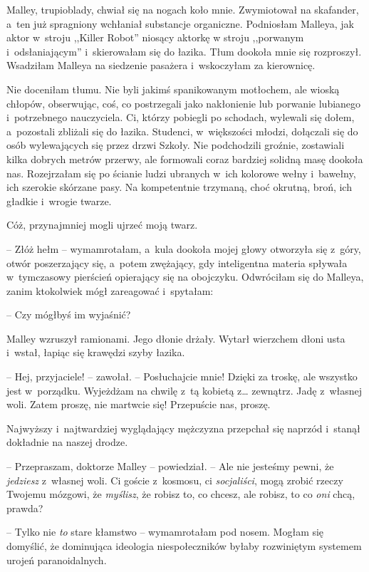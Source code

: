 \documentclass[oneside,polish,11pt,sfheadings]{mwbk}
\begin{document}
Malley, trupioblady, chwiał się na nogach koło mnie. Zwymiotował na
skafander, a~ten już spragniony wchłaniał substancje organiczne.
Podniosłam Malleya, jak aktor w~stroju ,,Killer Robot'' niosący aktorkę
w stroju ,,porwanym i~odsłaniającym'' i~skierowałam się do łazika. Tłum
dookoła mnie się rozproszył. Wsadziłam Malleya na siedzenie pasażera i~wskoczyłam za kierownicę.

Nie doceniłam tłumu. Nie byli jakimś spanikowanym motłochem, ale wioską
chłopów, obserwując, coś, co postrzegali jako nakłonienie lub porwanie
lubianego i~potrzebnego nauczyciela. Ci, którzy pobiegli po schodach,
wylewali się dołem, a~pozostali zbliżali się do łazika. Studenci, w~większości młodzi, dołączali się do osób wylewających się przez drzwi
Szkoły. Nie podchodzili groźnie, zostawiali kilka dobrych metrów
przerwy, ale formowali coraz bardziej solidną masę dookoła nas.
Rozejrzałam się po ścianie ludzi ubranych w~ich kolorowe wełny i~bawełny, ich szerokie skórzane pasy. Na kompetentnie trzymaną, choć
okrutną, broń, ich gładkie i~wrogie twarze.

Cóż, przynajmniej mogli ujrzeć moją twarz. 

-- Złóż hełm -- wymamrotałam, a~kula dookoła mojej głowy otworzyła się z~góry, otwór poszerzający się, a~potem zwężający, gdy inteligentna materia spływała w~tymczasowy
pierścień opierający się na obojczyku. Odwróciłam się do Malleya, zanim
ktokolwiek mógł zareagować i~spytałam:

-- Czy mógłbyś im wyjaśnić?

Malley wzruszył ramionami. Jego dłonie drżały. Wytarł wierzchem dłoni
usta i~wstał, łapiąc się krawędzi szyby łazika.

-- Hej, przyjaciele! -- zawołał. -- Posłuchajcie mnie! Dzięki za troskę,
ale wszystko jest w~porządku. Wyjeżdżam na chwilę z~tą kobietą z\ldots 
zewnątrz. Jadę z~własnej woli. Zatem proszę, nie martwcie się!
Przepuście nas, proszę.

Najwyższy i~najtwardziej wyglądający mężczyzna przepchał się naprzód i~stanął dokładnie na naszej drodze.

-- Przepraszam, doktorze Malley -- powiedział. -- Ale nie jesteśmy pewni,
że \textit{jedziesz} z~własnej woli. Ci goście z~kosmosu, ci
\textit{socjaliści}, mogą zrobić rzeczy Twojemu mózgowi, że
\textit{myślisz}, że robisz to, co chcesz, ale robisz, to co \textit{oni}
chcą, prawda?

-- Tylko nie \textit{to} stare kłamstwo -- wymamrotałam pod nosem. Mogłam
się domyślić, że dominująca ideologia niespołeczników byłaby rozwiniętym
systemem urojeń paranoidalnych.
\end{document}
